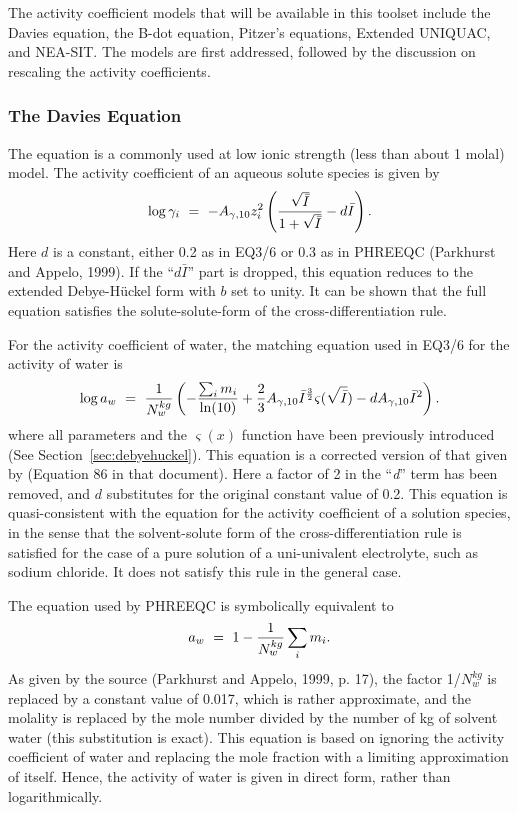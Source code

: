 The activity coefficient models that will be available in this toolset
include the Davies equation, the B-dot equation, Pitzer's equations,
Extended UNIQUAC, and NEA-SIT. The models are first addressed, followed by  
the discussion on rescaling the activity coefficients.

\subsubsection{The Davies Equation} 
\label{sec:davies}

The \citet{CWDavies_1962} equation is a commonly used at low ionic strength (less
than about 1 molal) model. The activity coefficient of an aqueous
solute species is given by
%
\begin{equation}
  \log \gamma _{i} \ =\  - A_{\gamma ,10} z_{i}^{2} 
                      \left( \frac{ \sqrt{ \bar{I} } }{1 + \sqrt{ \bar{I} } }- d \bar{I}  \right).
\end{equation}
%
Here $d$ is a constant, either 0.2 as in EQ3/6 \citep{Wolery-1992}
or 0.3 as in PHREEQC (Parkhurst and Appelo, 1999). If the
``$d \bar{I}$'' part is dropped, this equation reduces to the extended
Debye-H\"{u}ckel form with $b$ set to unity. It can be shown
that the full equation satisfies the solute-solute-form of the
cross-differentiation rule.

For the activity coefficient of water, the matching equation used in
EQ3/6 for the activity of water is
\begin{equation}
  \log a_{w} \ =\  \frac{1}{N_{w}^{kg} } \left(-\frac{\sum _{i}m_{i}  }{\ln (10)} 
  +
  \frac{2}{3} A_{\gamma ,10} \bar{I}^{\frac{3}{2} } \varsigma (\sqrt{\bar{I}} )-dA_{\gamma ,10} \bar{I}^{2} \right).
\end{equation}
where all parameters and the $\varsigma (x)$ function have been
previously introduced (See Section~\ref{sec:debyehuckel}). This
equation is a corrected version of that given by \citet{Wolery-1992}
(Equation 86 in that document). Here a factor of 2 in the 
``\textit{d}'' term has been
removed, and $d$ substitutes for the original constant value of
0.2. This equation is quasi-consistent with the equation for the
activity coefficient of a solution species, in the sense that the
solvent-solute form of the cross-differentiation rule is satisfied for
the case of a pure solution of a uni-univalent electrolyte, such as
sodium chloride. It does not satisfy this rule in the general case.

The equation used by PHREEQC is symbolically equivalent to
\begin{equation}
  a_{w} \ =\  1 - \frac{1}{N_{w}^{kg} } \sum _{i}m_{i}.  
\end{equation}
As given by the source (Parkhurst and Appelo, 1999, p. 17), the
factor 1/$N_{w}^{kg} $ is replaced by a constant value of 0.017, which is
rather approximate, and the molality is replaced by the mole number
divided by the number of kg of solvent water (this substitution is
exact). This equation is based on ignoring the activity coefficient of
water and replacing the mole fraction with a limiting approximation of
itself. Hence, the activity of water is given in direct form, rather
than logarithmically.

